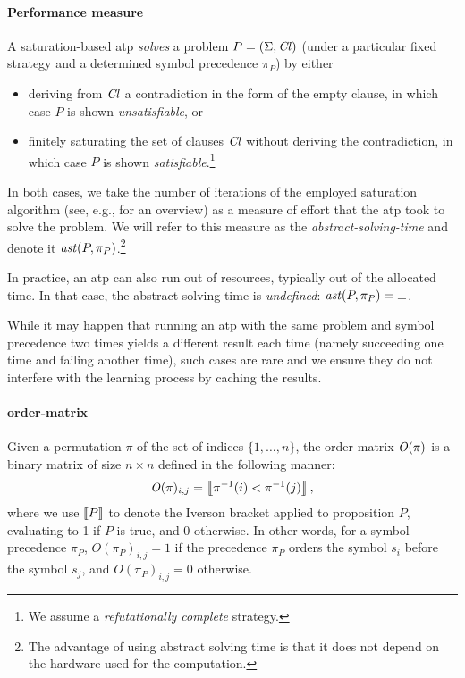 \paragraph{Performance measure} A saturation-based \gls{atp} \emph{solves} a problem \(P = (\Sigma,\operatorname{\mathit{Cl}})\)
(under a particular fixed strategy and a determined symbol precedence \(\pi_P\))  by either
\begin{itemize}
\item
	deriving from \(\operatorname{\mathit{Cl}}\) a contradiction in the form of the empty clause,
	in which case \(P\) is shown \emph{unsatisfiable}, or
\item
	finitely saturating the set of clauses \(\operatorname{\mathit{Cl}}\) without deriving the contradiction,
	in which case \(P\) is shown \emph{satisfiable}.\footnote{We assume a \emph{refutationally complete} strategy.}	
\end{itemize}
In both cases, we take the number of iterations of the employed saturation algorithm (see, e.g., \citet{DBLP:journals/jsc/RiazanovV03} for an overview) as a measure of effort that the \gls{atp} took to solve the problem.
We will refer to this measure as the \emph{\gls{abstract-solving-time}} and denote it \(\operatorname{\mathit{ast}}(P,\pi_P)\).\footnote{The advantage of using abstract solving time is that it does not depend on the hardware used for the computation.}

In practice, an \gls{atp} can also run out of resources, typically out of the allocated time.
In that case, the abstract solving time is \emph{undefined}: \(\operatorname{\mathit{ast}}(P,\pi_P) = \bot\).

While it may happen that running an \gls{atp} with the same problem and symbol precedence two times
yields a different result each time (namely succeeding one time and failing another time),
such cases are rare and we ensure they do not interfere with the learning process by caching the results.

\newpage

\paragraph{\Gls{order-matrix}}
Given a permutation \(\pi\) of the set of indices \(\{1,\ldots,n\}\),
the \gls{order-matrix} \(\operatorname{\mathit{O}}(\pi)\) is a binary matrix of size \(n \times n\)
defined in the following manner:
\begin{align*}
\operatorname{\mathit{O}}(\pi)_{i, j} = \left \llbracket \pi^{-1}(i) < \pi^{-1}(j) \right \rrbracket,
\end{align*}
where we use \(\left \llbracket P \right \rrbracket\) to denote the Iverson bracket \cite{Iverson1962} applied to proposition \(P\),
evaluating to 1 if \(P\) is true, and 0 otherwise.
%
In other words, for a symbol precedence \(\pi_P\), \(O(\pi_P)_{i, j} = 1\) if
the precedence \(\pi_P\) orders the symbol \(s_i\) before the symbol \(s_j\),
and \(O(\pi_P)_{i, j} = 0\) otherwise.

